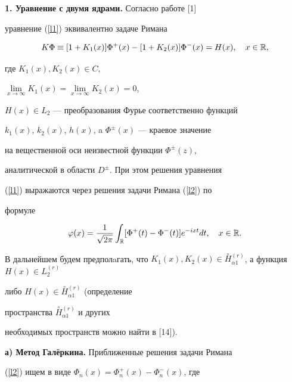 {\bf 1. Уравнение с двумя ядрами.} Согласно работе [1]


уравнение (\ref{l1}) эквивалентно задаче Римана


\begin{equation}


\label{l2} K\Phi\equiv[1+K_1(x)]\Phi^+(x)-


[1+K_2(x)]\Phi^-(x)=H(x), \quad x \in \Bbb R,


\end{equation}


где $K_1(x), K_2(x) \in C$,


$\lim\limits_{x\rightarrow\infty}


K_1(x)=\lim\limits_{x\rightarrow\infty} K_2(x)=0$,


$H(x)\in L_2$ --- преобразования Фурье соответственно функций


$k_1(x)$, $k_2(x)$, $h(x)$, a $\Phi^{\pm}(x)$ --- краевое значение


на вещественной оси неизвестной функции $\Phi^{\pm}(z)$,


аналитической в области $D^{\pm}$. При этом решения уравнения


(\ref{l1}) выражаются через решения задачи Римана (\ref{l2}) по


формуле


\begin{equation}


\label{l3} \varphi(x)=\frac{1}{\sqrt{2\pi}}\int_{\Bbb R}


[\Phi^+(t)-\Phi^-(t)]e^{-ixt}dt, \quad x \in \Bbb R.


\end{equation}


В дальнейшем будем предполaгать, что $K_1(x), K_2(x) \in


\overset{\circ}{H}{}_{\alpha1}^{(r)}$, а функция $H(x) \in L_2^{(r)}$


либо $H(x) \in \overset{\circ}{H}{}_{\alpha1}^{(r)}$ (определение


пространства $\overset{\circ}{H}{}_{\alpha1}^{(r)}$ и других


необходимых пространств можно найти в [14]).


\medskip





{\bf а) Метод Гал\"еркина.} Приближенные решения задачи Римана


(\ref{l2}) ищем в виде $\Phi_n(x)=\Phi^+_n(x)-\Phi^-_n(x)$, где


